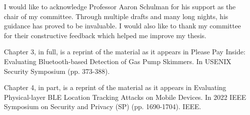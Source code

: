 \begin{acknowledgements}
    I would like to acknowledge Professor Aaron Schulman  for his support as the
    chair of my committee. Through multiple drafts and many long nights,
    his guidance has proved to be invaluable. I would also like to thank my committee for their
    constructive feedback which helped me improve my thesis.

    Chapter 3, in full, is a reprint of the material as it appears in
    Please Pay Inside: Evaluating Bluetooth-based Detection of Gas Pump Skimmers. In USENIX Security Symposium (pp. 373-388).

    Chapter 4, in part, is a reprint of the material as it appears in 
    Evaluating Physical-layer BLE Location Tracking Attacks on Mobile Devices. In 2022 IEEE Symposium on Security and Privacy (SP) (pp. 1690-1704). IEEE.
    
\end{acknowledgements}